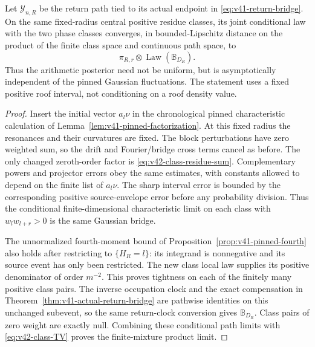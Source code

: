 \begin{corollary}
\label{cor:v42-phase-bridge-product}
Let $\mathcal Y_{n,R}$ be the return path tied to its actual endpoint
in \eqref{eq:v41-return-bridge}. On the same fixed-radius central
positive residue classes, its joint conditional law with the two phase
classes converges, in bounded-Lipschitz distance on the product of the
finite class space and continuous path space, to
\begin{equation}\label{eq:v42-phase-bridge-product}
        \pi_{R,r}\otimes\operatorname{Law}(\mathbb B_{D_R}).
\end{equation}
Thus the arithmetic posterior need not be uniform, but is
asymptotically independent of the pinned Gaussian fluctuations.
The statement uses a fixed positive roof interval, not conditioning
on a roof density value.
\end{corollary}
\begin{proof}
Insert the initial vector $a_l\nu$ in the chronological pinned
characteristic calculation of Lemma~\ref{lem:v41-pinned-factorization}.
At this fixed radius the resonances and their curvatures are fixed.
The block perturbations have zero weighted sum, so the drift and
Fourier/bridge cross terms cancel as before. The only changed
zeroth-order factor is \eqref{eq:v42-class-residue-sum}. Complementary
powers and projector errors obey the same estimates, with constants
allowed to depend on the finite list of $a_l\nu$. The sharp interval
error is bounded by the corresponding positive source-envelope
error before any probability division. Thus the conditional
finite-dimensional characteristic limit on each class with
$w_lw_{l+r}>0$ is the same Gaussian bridge.

The unnormalized fourth-moment bound of
Proposition~\ref{prop:v41-pinned-fourth} also holds after restricting
to $\{H_R=l\}$: its integrand is nonnegative and its source event
has only been restricted. The new class local law supplies its
positive denominator of order $m^{-2}$. This proves tightness on
each of the finitely many positive class pairs. The inverse occupation
clock and the exact compensation in
Theorem~\ref{thm:v41-actual-return-bridge} are pathwise identities
on this unchanged subevent, so the same return-clock conversion gives
$\mathbb B_{D_R}$. Class pairs of zero weight are exactly null.
Combining these conditional path limits with
\eqref{eq:v42-class-TV} proves the finite-mixture product limit.
\end{proof}


